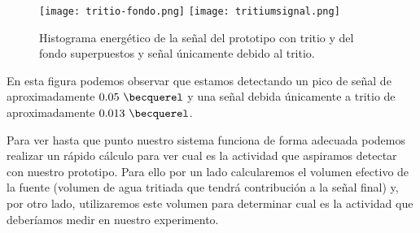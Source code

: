 \begin{figure}[htb]
\centering
{
\texttt{[image: tritio-fondo.png]} 
}
{
\texttt{[image: tritiumsignal.png]} 
}
\caption{Histograma energético de la señal del prototipo con tritio y del fondo superpuestos y señal únicamente debido al tritio.\label{senaltritio}}
\end{figure}


En esta figura podemos observar que estamos detectando un pico de señal de aproximadamente $0.05~\becquerel$ y una señal debida únicamente a tritio de aproximadamente $0.013~\becquerel$. 

Para ver hasta que punto nuestro sistema funciona de forma adecuada podemos realizar un rápido cálculo para ver cual es la actividad que aspiramos detectar con nuestro prototipo. Para ello por un lado calcularemos el volumen efectivo de la fuente (volumen de agua tritiada que tendrá contribución a la señal final) y, por otro lado, utilizaremos este volumen para determinar cual es la actividad que deberíamos medir en nuestro experimento.

